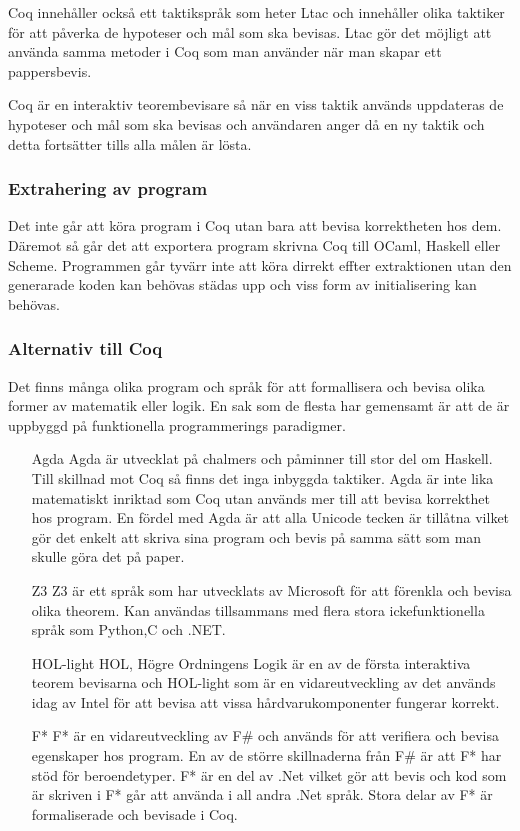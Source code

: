 Coq innehåller också ett taktikspråk som heter Ltac och innehåller olika
taktiker för att påverka de hypoteser och mål som ska bevisas. Ltac gör det
möjligt att använda samma metoder i Coq som man använder när man skapar ett
pappersbevis.

Coq är en interaktiv teorembevisare så när en viss taktik används uppdateras de
hypoteser och mål som ska bevisas och användaren anger då en ny taktik och
detta fortsätter tills alla målen är lösta.

\subsubsection{Extrahering av program}
Det inte går att köra program i Coq utan bara att bevisa korrektheten hos dem.
Däremot så går det att exportera program skrivna Coq till OCaml, Haskell eller
Scheme. Programmen går tyvärr inte att köra dirrekt effter extraktionen utan
den generarade koden kan behövas städas upp och viss form av initialisering kan
behövas.

\subsubsection{Alternativ till Coq}
Det finns många olika program och språk för att formallisera och bevisa olika
former av matematik eller logik. En sak som de flesta har gemensamt är att de
är uppbyggd på funktionella programmerings paradigmer.

\begin{itemize}

\item[Agda] Agda är utvecklat på chalmers och påminner till stor del om
Haskell. Till skillnad mot Coq så finns det inga inbyggda taktiker.  Agda är
inte lika matematiskt inriktad som Coq utan används mer till att bevisa
korrekthet hos program. En fördel med Agda är att alla Unicode tecken är
tillåtna vilket gör det enkelt att skriva sina program och bevis på samma sätt
som man skulle göra det på paper.

\item[Z3] Z3 är ett språk som har utvecklats av Microsoft för att förenkla och
bevisa olika theorem. Kan användas tillsammans med flera stora ickefunktionella
språk som Python,C och .NET.

\item[HOL-light] HOL, Högre Ordningens Logik är en av de första interaktiva
teorem bevisarna och HOL-light som är en vidareutveckling av det används idag
av Intel för att bevisa att vissa hårdvarukomponenter fungerar korrekt.

\item[F*] F* är en vidareutveckling av F\# och används för att verifiera och
bevisa egenskaper hos program. En av de större skillnaderna från F\# är att F*
har stöd för beroendetyper. F* är en del av .Net vilket gör att bevis och kod
som är skriven i F* går att använda i all andra .Net språk. Stora delar av F*
är formaliserade och bevisade i Coq.

\end{itemize}

\begin{comment}
Källor och annat material
HOL http://www.cl.cam.ac.uk/~jrh13/hol-light/
Z3 http://research.microsoft.com/en-us/um/redmond/projects/z3/old/
F* http://research.microsoft.com/en-us/projects/fstar/
\end{comment}
